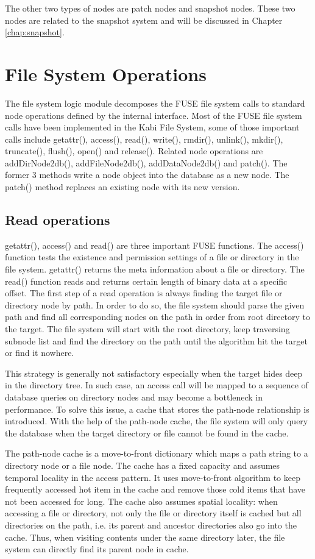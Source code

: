     The other two types of nodes are patch nodes and snapshot nodes. These two nodes are related to the snapshot system and will be discussed in Chapter \ref{chap:snapshot}.

\section{File System Operations}
    The file system logic module decomposes the FUSE file system calls to standard node operations defined by the internal interface. Most of the FUSE file system calls have been implemented in the Kabi File System, some of those important calls include getattr(), access(), read(), write(), rmdir(), unlink(), mkdir(), truncate(), flush(), open() and release(). Related node operations are addDirNode2db(), addFileNode2db(), addDataNode2db() and patch(). The former 3 methods write a node object into the database as a new node. The patch() method replaces an existing node with its new version.

\subsection{Read operations}
    getattr(), access() and read() are three important FUSE functions. The access() function tests the existence and permission settings of a file or directory in the file system. getattr() returns the meta information about a file or directory. The read() function reads and returns certain length of binary data at a specific offset.
The first step of a read operation is always finding the target file or directory node by path. In order to do so, the file system should parse the given path and find all corresponding nodes on the path in order from root directory to the target. The file system will start with the root directory, keep traversing subnode list and find the directory on the path until the algorithm hit the target or find it nowhere.

    This strategy is generally not satisfactory especially when the target hides deep in the directory tree. In such case, an access call will be mapped to a sequence of database queries on directory nodes and may become a bottleneck in performance. To solve this issue, a cache that stores the path-node relationship is introduced. With the help of the path-node cache, the file system will only query the database when the target directory or file cannot be found in the cache.

    The path-node cache is a move-to-front dictionary which maps a path string to a directory node or a file node. The cache has a fixed capacity and assumes temporal locality in the access pattern. It uses move-to-front algorithm to keep frequently accessed hot item in the cache and remove those cold items that have not been accessed for long. The cache also assumes spatial locality: when accessing a file or directory, not only the file or directory itself is cached but all directories on the path, i.e. its parent and ancestor directories also go into the cache. Thus, when visiting contents under the same directory later, the file system can directly find its parent node in cache.

